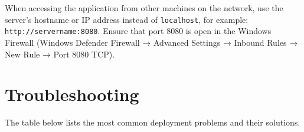 \documentclass[12pt,a4paper]{report}
\begin{document}
\begin{notebox}
When accessing the application from other machines on the network, use the server's hostname or IP address instead of \texttt{localhost}, for example: \texttt{http://servername:8080}. Ensure that port 8080 is open in the Windows Firewall (Windows Defender Firewall → Advanced Settings → Inbound Rules → New Rule → Port 8080 TCP).
\end{notebox}

\chapter{Troubleshooting}

The table below lists the most common deployment problems and their solutions.
\end{document}
